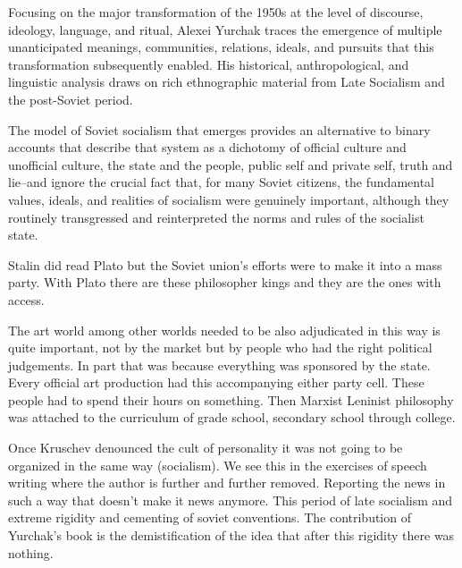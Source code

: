 \documentclass{article}
\begin{document}
Focusing on the major transformation of the 1950s at the level of discourse, ideology, language, and ritual, Alexei Yurchak traces the emergence of multiple unanticipated meanings, communities, relations, ideals, and pursuits that this transformation subsequently enabled. His historical, anthropological, and linguistic analysis draws on rich ethnographic material from Late Socialism and the post-Soviet period.


The model of Soviet socialism that emerges provides an alternative to binary accounts that describe that system as a dichotomy of official culture and unofficial culture, the state and the people, public self and private self, truth and lie--and ignore the crucial fact that, for many Soviet citizens, the fundamental values, ideals, and realities of socialism were genuinely important, although they routinely transgressed and reinterpreted the norms and rules of the socialist state.

\vspace{3mm}

Stalin did read Plato but the Soviet union's efforts were to make it into a mass party.  With Plato there are these philosopher kings and they are the ones with access.  

\vspace{3mm}

The art world among other worlds needed to be also adjudicated in this way is quite important, not by the market but by people who had the right political judgements.  In part that was because everything was sponsored by the state.  Every official art production had this accompanying either party cell.  These people had to spend their hours on something.  Then Marxist Leninist philosophy was attached to the curriculum of grade school, secondary school through college.  

\vspace{3mm}

Once Kruschev denounced the cult of personality it was not going to be organized in the same way (socialism).  We see this in the exercises of speech writing where the author is further and further removed.  Reporting the news in such a way that doesn't make it news anymore.  This period of late socialism and extreme rigidity and cementing of soviet conventions.  The contribution of Yurchak's book is the demistification of the idea that after this rigidity there was nothing.  

\vspace{3mm}
\end{document}
